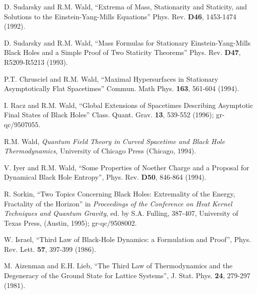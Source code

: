 \documentclass[12pt]{article}
\newcommand{\comment}[1]{}
\newcommand{\keywords}[1]{}
\begin{document}
\begin{thebibliography}{999}
\comment{article} D. Sudarsky and R.M. Wald, ``Extrema of
Mass, Stationarity and Staticity, and Solutions to the
Einstein-Yang-Mills Equations'' Phys. Rev. {\bf D46}, 1453-1474
(1992).
\keywords{black hole thermodynamics, Einstein-Yang-Mills theory}

\comment{article} D. Sudarsky and R.M. Wald, ``Mass
Formulas for Stationary Einstein-Yang-Mills Black Holes and a Simple
Proof of Two Staticity Theorems'' Phys. Rev. {\bf D47}, R5209-R5213 (1993).
\keywords{black hole thermodynamics, Einstein-Yang-Mills theory,
no-hair theorems}

\comment{article} P.T. Chrusciel and R.M. Wald, ``Maximal
Hypersurfaces in Stationary Asymptotically Flat Spacetimes''
Commun. Math Phys. {\bf 163}, 561-604 (1994).
\keywords{black holes, differential geometry}

\comment{article} I. Racz and R.M. Wald, ``Global
Extensions of Spacetimes Describing Asymptotic Final States of Black
Holes'' Class. Quant. Grav. {\bf 13}, 539-552 (1996);  gr-qc/9507055.
\keywords{black holes, differential geometry, Killing horizons}

\comment{book} R.M. Wald, {\it Quantum Field Theory in
Curved Spacetime and Black Hole Thermodynamics}, University of Chicago
Press (Chicago, 1994).  \keywords{black hole thermodynamics, black
holes, quantum field theory in curved spacetime, generalized second law}

\comment{article} V. Iyer and R.M. Wald, ``Some Properties
of Noether Charge and a Proposal for Dynamical Black Hole Entropy'',
Phys. Rev. {\bf D50}, 846-864 (1994).
\keywords{black hole thermodynamics, black holes, variational principles}

\comment{inbook} R. Sorkin, ``Two Topics Concerning
Black Holes: Extremality of the Energy, Fractality of the Horizon'' in
{\it Proceedings of the Conference on Heat Kernel Techniques and
Quantum Gravity}, ed. by S.A. Fulling, 387-407, University of Texas
Press, (Austin, 1995); gr-qc/9508002. \keywords{black hole
thermodynamics, event horizons, entropy}

\comment{article} W. Israel, ``Third Law of Black-Hole
Dynamics: a Formulation and Proof'', Phys. Rev. Lett. {\bf 57},
397-399 (1986).  \keywords{black hole thermodynamics, third law}

\comment{article} M. Aizenman and E.H. Lieb, ``The Third
Law of Thermodynamics and the Degeneracy of the Ground State for
Lattice Systems'', J. Stat. Phys.  {\bf 24}, 279-297 (1981).
\keywords{statistical mechanics, thermodynamics, third law}


\end{thebibliography}
\end{document}
